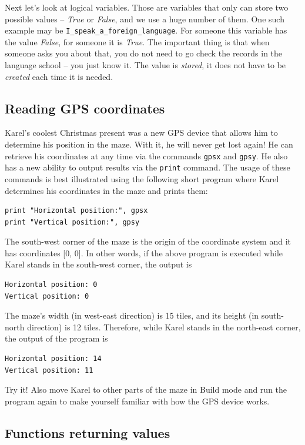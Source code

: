 \documentclass[article,A4,12pt]{llncs}
\begin{document}
{{{{Next let's look at logical variables. Those are variables that only can store two possible values --
{\em True} or {\em False}, and we use a huge number of them. One such example may be {\tt I\_speak\_a\_foreign\_language}.
For someone this variable has the value {\em False}, for someone it is {\em True}. The important 
thing is that when someone asks you about that, you do not need to go check the records in the language 
school -- you just know it. The value is {\em stored}, it does not have to be {\em created} each time 
it is needed.

\subsection{Reading GPS coordinates}

Karel's coolest Christmas present was a new GPS device that allows him to determine his position 
in the maze. With it, he will never get lost again! He can retrieve his coordinates at any time via the 
commands {\tt gpsx} and {\tt gpsy}. He also has a new ability to output results via the {\tt print} 
command. The usage of these commands is best illustrated using the following short program where 
Karel determines his coordinates in the maze and prints them:

\begin{verbatim}
print "Horizontal position:", gpsx
print "Vertical position:", gpsy
\end{verbatim}
The south-west corner of the maze is the origin of the coordinate system and it has 
coordinates [0, 0]. In other words, if the above program is executed while Karel stands 
in the south-west corner, the output is

\begin{verbatim}
Horizontal position: 0
Vertical position: 0
\end{verbatim}
The maze's width (in west-east direction) is 15 tiles, and its height (in south-north direction) 
is 12 tiles. Therefore, while Karel stands in the north-east corner, the output of the program is
\begin{verbatim}
Horizontal position: 14
Vertical position: 11
\end{verbatim}
Try it! Also move Karel to other parts of the maze in Build mode and run the program again
to make yourself familiar with how the GPS device works.

\subsection{Functions returning values}

}}}}
\end{document}

